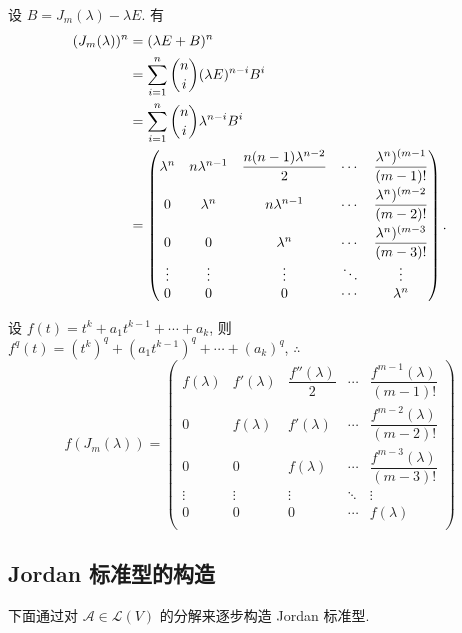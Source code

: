\documentclass{ctexart}
\begin{document}
\begin{example}[书上的例 3]
    设 $B=J_m(\lambda)-\lambda E$. 有
    \begin{equation}\label{eq4.1}
        \begin{aligned}
            (J_m(\lambda))^n & =(\lambda E+B)^n \\
            & =\sum\limits_{i=1}^n\dbinom{n}{i}(\lambda E)^{n-i}B^i \\
            & =\sum\limits_{i=1}^n\dbinom{n}{i}\lambda^{n-i}B^i \\
            & =\begin{pmatrix}
                \lambda^n & n\lambda^{n-1} & \dfrac{n(n-1)\lambda^{n-2}}{2} & \cdots & \dfrac{\lambda^n)^{(m-1}}{(m-1)!} \\[8pt]
                0 & \lambda^n & n\lambda^{n-1} & \cdots & \dfrac{\lambda^n)^{(m-2}}{(m-2)!} \\[8pt]
                0 & 0 & \lambda^n & \cdots & \dfrac{\lambda^n)^{(m-3}}{(m-3)!} \\
                \vdots & \vdots & \vdots & \ddots & \vdots \\
                0 & 0 & 0 & \cdots & \lambda^n \\
            \end{pmatrix}.
        \end{aligned}
    \end{equation}

    设 $f(t)=t^k+a_1t^{k-1}+\cdots+a_k$, 则 $f^{q}(t)=(t^k)^{q}+(a_1t^{k-1})^{q}+\cdots+(a_k)^{q}$, $\therefore$
    \[f(J_m(\lambda))=\begin{pmatrix}
        f(\lambda) & f'(\lambda) & \dfrac{f''(\lambda)}{2} & \cdots & \dfrac{f^{m-1}(\lambda)}{(m-1)!} \\[8pt]
        0 & f(\lambda) & f'(\lambda) & \cdots & \dfrac{f^{m-2}(\lambda)}{(m-2)!} \\[8pt]
        0 & 0 & f(\lambda) & \cdots & \dfrac{f^{m-3}(\lambda)}{(m-3)!} \\
        \vdots & \vdots & \vdots & \ddots & \vdots \\
        0 & 0 & 0 & \cdots & f(\lambda) \\
    \end{pmatrix}\]
\end{example}
\subsection{Jordan 标准型的构造}
下面通过对 $\mathcal{A}\in\mathcal{L}(V)$ 的分解来逐步构造 Jordan 标准型.
\end{document}

